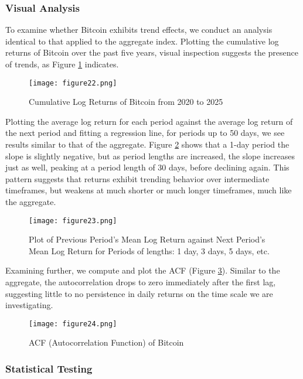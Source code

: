 \documentclass[
]{article}
\begin{document}
\subsubsection{Visual Analysis}\label{visual-analysis-5}

To examine whether Bitcoin exhibits trend effects, we conduct an
analysis identical to that applied to the aggregate index. Plotting the
cumulative log returns of Bitcoin over the past five years, visual
inspection suggests the presence of trends, as Figure
\textcolor{blue}{\ref{fig:22}} indicates.

\begin{figure}[H]
    \centering
    \texttt{[image: figure22.png]}
    \caption{Cumulative Log Returns of Bitcoin from 2020 to 2025}
    \label{fig:22}
\end{figure}

Plotting the average log return for each period against the average log
return of the next period and fitting a regression line, for periods up
to 50 days, we see results similar to that of the aggregate. Figure
\textcolor{blue}{\ref{fig:23}} shows that a 1-day period the slope is
slightly negative, but as period lengths are increased, the slope
increases just as well, peaking at a period length of 30 days, before
declining again. This pattern suggests that returns exhibit trending
behavior over intermediate timeframes, but weakens at much shorter or
much longer timeframes, much like the aggregate.

\begin{figure}[H]
    \centering
    \texttt{[image: figure23.png]}
    \caption{Plot of Previous Period's Mean Log Return against Next Period's Mean Log Return for Periods of lengths: 1 day, 3 days, 5 days, etc.}
    \label{fig:23}
\end{figure}

Examining further, we compute and plot the ACF (Figure
\textcolor{blue}{\ref{fig:24}}). Similar to the aggregate, the
autocorrelation drops to zero immediately after the first lag,
suggesting little to no persistence in daily returns on the time scale
we are investigating.

\begin{figure}[H]
    \centering
    \texttt{[image: figure24.png]}
    \caption{ACF (Autocorrelation Function) of Bitcoin}
    \label{fig:24}
\end{figure}

\subsubsection{Statistical Testing}\label{statistical-testing-5}
\end{document}
